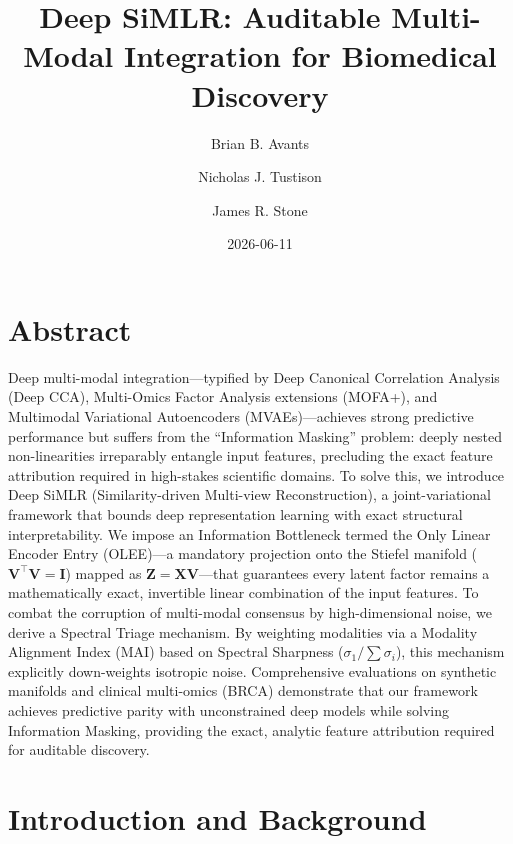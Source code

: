 \documentclass[
  letterpaper,
]{report}
\title{Deep SiMLR: Auditable Multi-Modal Integration for Biomedical
Discovery}
\author{Brian B. Avants \and Nicholas J. Tustison \and James R. Stone}
\date{2026-06-11}
\renewcommand*\contentsname{Table of contents}
\newcommand\contentsname{Table of contents}
\begin{document}
\maketitle

\renewcommand*\contentsname{Table of contents}
{
\setcounter{tocdepth}{2}
\tableofcontents
}


\chapter*{Abstract}\label{abstract}


Deep multi-modal integration---typified by Deep Canonical Correlation
Analysis (Deep CCA), Multi-Omics Factor Analysis extensions (MOFA+), and
Multimodal Variational Autoencoders (MVAEs)---achieves strong predictive
performance but suffers from the ``Information Masking'' problem: deeply
nested non-linearities irreparably entangle input features, precluding
the exact feature attribution required in high-stakes scientific
domains. To solve this, we introduce Deep SiMLR (Similarity-driven
Multi-view Reconstruction), a joint-variational framework that bounds
deep representation learning with exact structural interpretability. We
impose an Information Bottleneck termed the Only Linear Encoder Entry
(OLEE)---a mandatory projection onto the Stiefel manifold
(\(\mathbf{V}^\top \mathbf{V} = \mathbf{I}\)) mapped as
\(\mathbf{Z} = \mathbf{X}\mathbf{V}\)---that guarantees every latent
factor remains a mathematically exact, invertible linear combination of
the input features. To combat the corruption of multi-modal consensus by
high-dimensional noise, we derive a Spectral Triage mechanism. By
weighting modalities via a Modality Alignment Index (MAI) based on
Spectral Sharpness (\(\sigma_1 / \sum \sigma_i\)), this mechanism
explicitly down-weights isotropic noise. Comprehensive evaluations on
synthetic manifolds and clinical multi-omics (BRCA) demonstrate that our
framework achieves predictive parity with unconstrained deep models
while solving Information Masking, providing the exact, analytic feature
attribution required for auditable discovery.


\chapter{Introduction and Background}\label{introduction-and-background}
\end{document}
